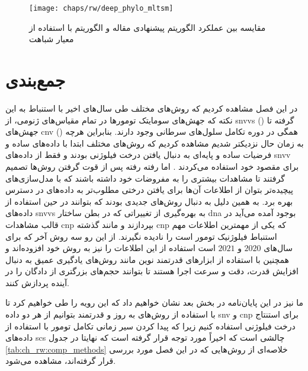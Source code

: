 \begin{figure}[!ht]
	\centerline{\texttt{[image: chaps/rw/deep\_phylo\_mltsm]}}
	\caption{مقایسه بین عملکرد الگوریتم پیشنهادی مقاله  و الگوریتم  با استفاده از معیار شباهت  }
	\label{fig:ch_rw:deep_phylo_mltsm}
\end{figure}




\section{جمع‌بندی}
در این فصل مشاهده کردیم که روش‌های مختلف طی سال‌های اخیر با استنباط به این نکته که جهش‌های سومایتک تومورها در تمام مقیاس‌های ژنومی، از  \glspl{snvv} () گرفته تا جهش‌های \gls{cnv} () همگی در دوره تکامل سلول‌های سرطانی وجود دارند. بنابراین هرچه به زمان حال نزدیکتر شدیم مشاهده کردیم که روش‌های مختلف ابتدا با داده‌های ساده و فرضیات ساده و پایه‌ای به دنبال یافتن درخت فیلوژنی بودند و فقط از داده‌های \gls{snvv} برای مقصود خود استفاده می‌کردند \cite{singer2018single, malikic2015clonality, mcpherson2016divergent, el2018sphyr}. اما رفته رفته پس از قوت گرفتن روش‌ها تصمیم گرفتند تا مشاهدات بیشتری را به مفروضات خود داشته باشند که با مدل‌سازی‌های پیچیده‌تر بتوان از اطلاعات آن‌ها برای یافتن درختی مطلوب‌تر به داده‌های در دسترس بهره برد. به همین دلیل به دنبال روش‌های جدیدی بودند که بتوانند در حین استفاده از داده‌های \glspl{snvv} به بهره‌گیری از تغییراتی که در بطن ساختار \gls{dna} بوجود آمده می‌آید در قالب مشاهدات \gls{cnp} بپردازند و مانند گذشته \gls{cnp} که یکی از مهمترین اطلاعات مهم استنباط فیلوژنیک تومور است را نادیده نگیرند. از این رو سه روش آخر که برای سال‌های $2020$ و $2021$ است استفاده از این اطلاعات را نیز به روش خود افزوده‌اند و همچنین با استفاده از ابزارهای قدرتمند نوین مانند روش‌های یادگیری عمیق به دنبال افزایش قدرت، دقت و سرعت اجرا هستند تا بتوانند حجم‌های بزرگتری از دادگان را در آینده پردازش کنند. 

ما نیز در این پایان‌نامه در بخش بعد نشان خواهیم داد که این رویه را طی خواهیم کرد تا با استفاده از روش‌های به روز و قدرتمند بتوانیم از هر دو داده \gls{snv} و \gls{cnp} برای استنتاج درخت فیلوژنی استفاده کنیم زیرا که پیدا کردن سیر زمانی تکامل تومور با استفاده از داده‌های \gls{scs} چالشی است که اخیراً مورد توجه قرار گرفته است که نهایتا در جدول \ref{tab:ch_rw:comp_methods} خلاصه‌ای از روش‌هایی که در این فصل مورد بررسی قرار گرفته‌اند، مشاهده می‌شود. 

